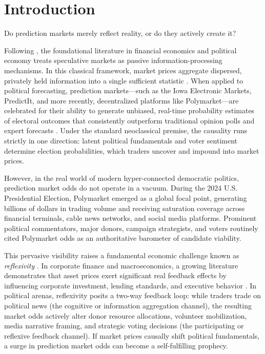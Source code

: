 \documentclass[12pt]{article}
\begin{document}
\newpage

\section{Introduction}

Do prediction markets merely reflect reality, or do they actively create it? 

Following \citet{hayek1945use}, the foundational literature in financial economics and political economy treats speculative markets as passive information-processing mechanisms. In this classical framework, market prices aggregate dispersed, privately held information into a single sufficient statistic \citep{grossman1980impossibility}. When applied to political forecasting, prediction markets—such as the Iowa Electronic Markets, PredictIt, and more recently, decentralized platforms like Polymarket—are celebrated for their ability to generate unbiased, real-time probability estimates of electoral outcomes that consistently outperform traditional opinion polls and expert forecasts \citep{wolfers2004prediction, snowberg2007partisan, manski2006interpreting}. Under the standard neoclassical premise, the causality runs strictly in one direction: latent political fundamentals and voter sentiment determine election probabilities, which traders uncover and impound into market prices.

However, in the real world of modern hyper-connected democratic politics, prediction market odds do not operate in a vacuum. During the 2024 U.S. Presidential Election, Polymarket emerged as a global focal point, generating billions of dollars in trading volume and receiving saturation coverage across financial terminals, cable news networks, and social media platforms. Prominent political commentators, major donors, campaign strategists, and voters routinely cited Polymarket odds as an authoritative barometer of candidate viability. 

This pervasive visibility raises a fundamental economic challenge known as \textit{reflexivity} \citep{soros1987alchemy, soros2013fallibility}. In corporate finance and macroeconomics, a growing literature demonstrates that asset prices exert significant real feedback effects by influencing corporate investment, lending standards, and executive behavior \citep{bond2012real, morris2002social, angeletos2007dynamic}. In political arenas, reflexivity posits a two-way feedback loop: while traders trade on political news (the cognitive or information aggregation channel), the resulting market odds actively alter donor resource allocations, volunteer mobilization, media narrative framing, and strategic voting decisions (the participating or reflexive feedback channel). If market prices causally shift political fundamentals, a surge in prediction market odds can become a self-fulfilling prophecy.
\end{document}
